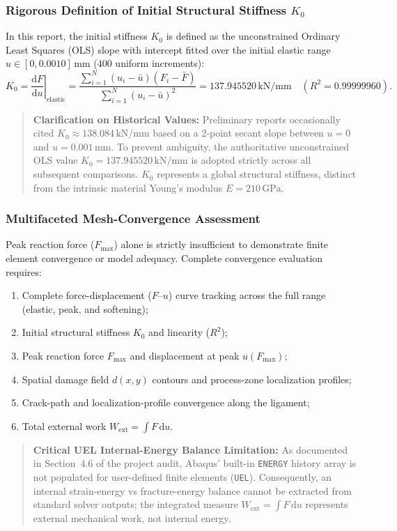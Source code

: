 \subsubsection{Rigorous Definition of Initial Structural Stiffness \texorpdfstring{$K_0$}{K0}}
In this report, the initial stiffness $K_0$ is defined as the unconstrained Ordinary Least Squares (OLS) slope with intercept fitted over the initial elastic range $u \in [0, 0.0010]\,\mathrm{mm}$ ($400$ uniform increments):
\begin{equation}
\label{eq:ols_stiffness}
K_0 = \left.\frac{\mathrm{d}F}{\mathrm{d}u}\right|_{\mathrm{elastic}} = \frac{\sum_{i=1}^N (u_i - \bar{u})(F_i - \bar{F})}{\sum_{i=1}^N (u_i - \bar{u})^2} = 137.945520\,\mathrm{kN/mm} \quad (R^2 = 0.99999960).
\end{equation}
\begin{quote}
\textbf{Clarification on Historical Values:} Preliminary reports occasionally cited $K_0 \approx 138.084\,\mathrm{kN/mm}$ based on a 2-point secant slope between $u=0$ and $u=0.001\,\mathrm{mm}$. To prevent ambiguity, the authoritative unconstrained OLS value $K_0 = 137.945520\,\mathrm{kN/mm}$ is adopted strictly across all subsequent comparisons. $K_0$ represents a global structural stiffness, distinct from the intrinsic material Young's modulus $E = 210\,\mathrm{GPa}$.
\end{quote}

\subsubsection{Multifaceted Mesh-Convergence Assessment}
Peak reaction force ($F_{\max}$) alone is strictly insufficient to demonstrate finite element convergence or model adequacy. Complete convergence evaluation requires:
\begin{enumerate}[leftmargin=4mm,itemsep=1pt,topsep=1pt]
  \item Complete force-displacement ($F$--$u$) curve tracking across the full range (elastic, peak, and softening);
  \item Initial structural stiffness $K_0$ and linearity ($R^2$);
  \item Peak reaction force $F_{\max}$ and displacement at peak $u(F_{\max})$;
  \item Spatial damage field $d(x, y)$ contours and process-zone localization profiles;
  \item Crack-path and localization-profile convergence along the ligament;
  \item Total external work $W_{\mathrm{ext}} = \int F\,\mathrm{d}u$.
\end{enumerate}

\begin{quote}
\textbf{Critical UEL Internal-Energy Balance Limitation:} As documented in Section~4.6 of the project audit, Abaqus' built-in \texttt{ENERGY} history array is not populated for user-defined finite elements (\texttt{UEL}). Consequently, an internal strain-energy vs fracture-energy balance cannot be extracted from standard solver outputs; the integrated measure $W_{\mathrm{ext}} = \int F\,\mathrm{d}u$ represents external mechanical work, not internal energy.
\end{quote}
